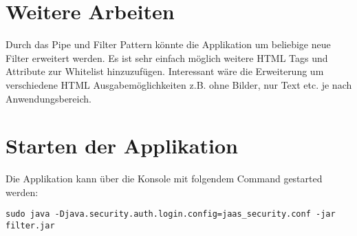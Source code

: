 \section{Weitere Arbeiten}

Durch das Pipe und Filter Pattern könnte die Applikation um beliebige neue Filter erweitert werden. Es ist sehr einfach möglich weitere HTML Tags und Attribute zur Whitelist 
hinzuzufügen. Interessant wäre die Erweiterung um verschiedene HTML Ausgabemöglichkeiten z.B. ohne Bilder, nur Text etc. je nach Anwendungsbereich.

\section{Starten der Applikation}

Die Applikation kann über die Konsole mit folgendem Command gestarted werden:
\newline
\begin{lstlisting}[caption=Start der Applikation]
sudo java -Djava.security.auth.login.config=jaas_security.conf -jar filter.jar 
\end{lstlisting}
